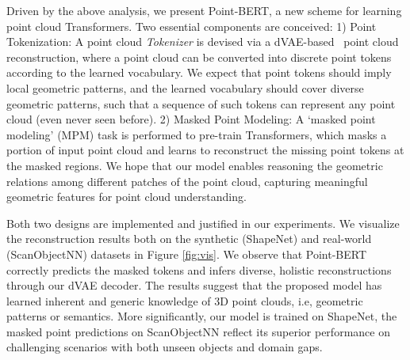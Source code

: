\documentclass[10pt,twocolumn,letterpaper]{article}
\begin{document}
	
Driven by the above analysis, we present Point-BERT, a new scheme for learning point cloud Transformers. Two essential components are conceived: 1) Point Tokenization:  A  point cloud \textit{Tokenizer} is devised via a dVAE-based~\cite{rolfe2016discrete} point cloud reconstruction, where a point cloud can be converted into discrete point tokens according to the learned vocabulary. We expect that point tokens should imply local geometric patterns, and the learned vocabulary should cover diverse geometric patterns, such that a sequence of such tokens can represent any point cloud (even never seen before). 2) Masked Point Modeling: A `masked point modeling' (MPM) task is performed to pre-train Transformers, which masks a portion of input point cloud and learns to reconstruct the missing point tokens at the masked regions. We hope that our model enables reasoning the geometric relations among different patches of the point cloud, capturing meaningful geometric features for point cloud understanding.


Both two designs are implemented and justified in our experiments. 
We visualize the reconstruction results both on the synthetic (ShapeNet\cite{shapenet}) and real-world (ScanObjectNN\cite{uy2019revisiting}) datasets in Figure \ref{fig:vis}. We observe that Point-BERT correctly predicts the masked tokens and infers diverse, holistic reconstructions through our dVAE decoder. The results suggest that the proposed model has learned inherent and generic knowledge of 3D point clouds, i.e, geometric patterns or semantics. More significantly, our model is trained on  ShapeNet, the masked point predictions on ScanObjectNN reflect its superior performance on challenging scenarios with both unseen objects and domain gaps. 
\end{document}

